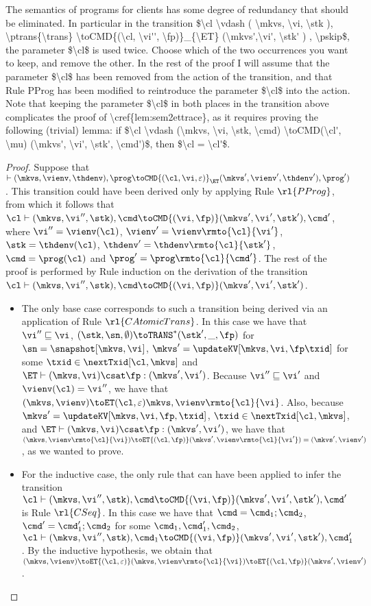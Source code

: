 \ac{The semantics of programs for clients has some degree of redundancy that 
should be eliminated. In particular in the transition 
$\cl \vdash 
        ( \mkvs, \vi, \stk ), \ptrans{\trans} 
        \toCMD{(\cl, \vi'', \fp)}_{\ET}
        (\mkvs',\vi', \stk' ) , \pskip$, the parameter $\cl$ is used twice. 
Choose which of the two occurrences you want to keep, and remove the other. 
In the rest of the proof I will assume that the parameter $\cl$ has been removed from the 
action of the transition, and that Rule PProg has been modified to reintroduce the parameter 
$\cl$ into the action. Note that keeping the parameter $\cl$ in both places in the transition above 
complicates the proof of \cref{lem:sem2ettrace}, as it requires proving the following (trivial) lemma: 
if $\cl \vdash (\mkvs, \vi, \stk, \cmd) \toCMD(\cl', \mu) (\mkvs', \vi', \stk', \cmd')$, then $\cl = \cl'$.}

\begin{proof}
Suppose that $ \vdash (\mkvs, \vienv, \thdenv ), \prog \toCMD{(\cl, \vi, \varepsilon)}_{\ET} 
( \mkvs', \vienv', \thdenv') , \prog' )$. This transition could have been derived only by 
applying Rule $\rl{PProg}$, from which it follows that $\cl \vdash (\mkvs, \vi'', \stk), \cmd \toCMD{(\vi, \fp)} 
(\mkvs', \vi', \stk'), \cmd'$, where $\vi'' = \vienv(\cl)$, $\vienv' = \vienv\rmto{\cl}{\vi'}$, $\stk = \thdenv(\cl)$, $\thdenv' = \thdenv\rmto{\cl}{\stk'}$, $\cmd = \prog(\cl)$ 
and $\prog' = \prog\rmto{\cl}{\cmd'}$. The rest of the proof is performed by Rule induction on the 
derivation of the transition $\cl \vdash (\mkvs, \vi'', \stk), \cmd \toCMD{(\vi, \fp)} 
(\mkvs', \vi', \stk')$. 
\begin{itemize}
\item The only base case corresponds to such a transition being derived via an 
application of  Rule $\rl{CAtomicTrans}$. In this case we have that 
$\vi'' \sqsubseteq \vi$, $(\stk, \sn, \emptyset) \toTRANS^{\ast} (\stk', \_, \fp)$ for $\sn = \snapshot[\mkvs, \vi]$, 
$\mkvs' = \updateKV[\mkvs, \vi, \fp \txid]$ for some $\txid \in \nextTxid[\cl, \mkvs]$ and 
$\ET \vdash (\mkvs,\vi) \csat \fp: (\mkvs', \vi')$. Because $\vi'' \sqsubseteq \vi'$ and $\vienv(\cl) = \vi''$, 
we have that $(\mkvs, \vienv) \toET(\cl, \varepsilon) \mkvs, \vienv\rmto{\cl}{\vi}$. Also, because 
$\mkvs' = \updateKV[\mkvs, \vi, \fp, \txid]$, $\txid \in \nextTxid[\cl, \mkvs]$, and $\ET \vdash (\mkvs, \vi) 
\csat \fp: (\mkvs', \vi')$, we have that 
$(\mkvs, \vienv\rmto{\cl}{\vi}) \toET{(\cl, \fp)} (\mkvs', \vienv\rmto{\cl}{\vi'}) = (\mkvs', \vienv')$, as we wanted 
to prove.
\item For the inductive case, the only rule that can have been applied to infer the transition 
$\cl \vdash (\mkvs, \vi'', \stk), \cmd \toCMD{(\vi, \fp)} (\mkvs', \vi', \stk'), \cmd'$ is Rule $\rl{CSeq}$. 
In this case we have that $\cmd = \cmd_1 ; \cmd_2$, $\cmd' = \cmd_1' ; \cmd_2$ for some $\cmd_1, \cmd_1', \cmd_2$, 
$\cl \vdash (\mkvs, \vi'', \stk), \cmd_1 \toCMD{(\vi, \fp)} (\mkvs', \vi', \stk'), \cmd_1'$. By the inductive hypothesis, 
we obtain that 
$(\mkvs, \vienv) \toET{(\cl, \varepsilon)} (\mkvs, \vienv\rmto{\cl}{\vi}) \toET{(\cl, \fp)} (\mkvs', \vienv')$.
\end{itemize}
\end{proof}

